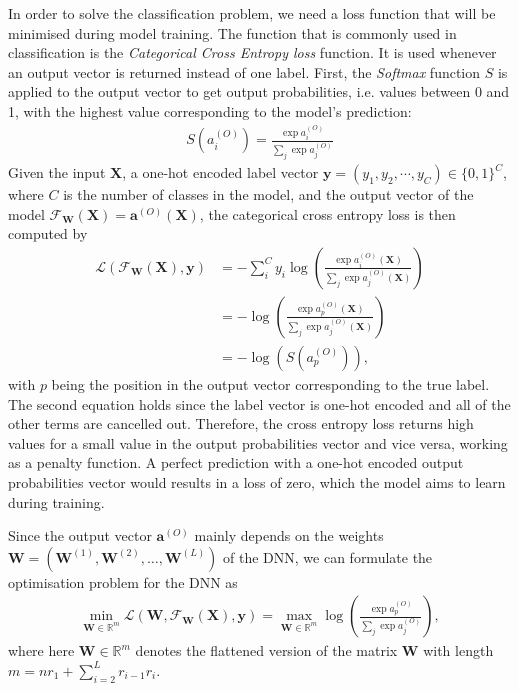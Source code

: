 In order to solve the classification problem, we need a loss function that will be minimised during model training.
The function that is commonly used in classification is the \textit{Categorical Cross Entropy loss} function. It is used whenever an output vector is returned instead of one label. First, the \textit{Softmax} function $S$ is applied to the output vector to get output probabilities, i.e. values between 0 and 1, with the highest value corresponding to the model's prediction:
\begin{align}
    S\left(a^{(O)}_i\right) = \frac{\exp a^{(O)}_i}{\sum_j \exp a^{(O)}_j}
\end{align}
Given the input $\mathbf{X}$, a one-hot encoded label vector $\mathbf{y}=(y_1,y_2, \cdots, y_C) \in \{0,1\}^C$, where $C$ is the number of classes in the model, and the output vector of the model $\mathcal{F}_{\mathbf{W}}(\mathbf{X})=\mathbf{a}^{(O)}(\mathbf{X})$, the categorical cross entropy loss is then computed by
\begin{align}
    \mathcal{L}(\mathcal{F}_{\mathbf{W}}(\mathbf{X}), \mathbf{y}) &= - \sum_{i}^C y_i \log \left( \frac{\exp a^{(O)}_i(\mathbf{X})}{\sum_j \exp a^{(O)}_j(\mathbf{X})} \right) \\
    &= - \log \left( \frac{\exp a^{(O)}_p(\mathbf{X})}{\sum_j \exp a^{(O)}_j(\mathbf{X})} \right) \\
    &= - \log \left( S\left(a^{(O)}_p\right) \right),
\end{align}
with $p$ being the position in the output vector corresponding to the true label. The second equation holds since the label vector is one-hot encoded and all of the other terms are cancelled out. Therefore, the cross entropy loss returns high values for a small value in the output probabilities vector and vice versa, working as a penalty function. A perfect prediction with a one-hot encoded output probabilities vector would results in a loss of zero, which the model aims to learn during training. 

Since the output vector $\mathbf{a}^{(O)}$ mainly depends on the weights $\mathbf{W} = (\mathbf{W}^{(1)}, \mathbf{W}^{(2)}, \dots, \mathbf{W}^{(L)})$ of the DNN, we can formulate the optimisation problem for the DNN as
\begin{align}
    \min_{\mathbf{W} \in \mathbb{R}^{m}} \mathcal{L}(\mathbf{W},\mathcal{F}_{\mathbf{W}}(\mathbf{X}), \mathbf{y}) = \max_{\mathbf{W} \in \mathbb{R}^{m}} \log \left( \frac{\exp a^{(O)}_p}{\sum_j  \exp a^{(O)}_j} \right),
\end{align}
where here $\mathbf{W} \in \mathbb{R}^m$ denotes the flattened version of the matrix $\mathbf{W}$ with length $m = nr_1 + \sum_{i=2}^L r_{i-1}r_i$.

